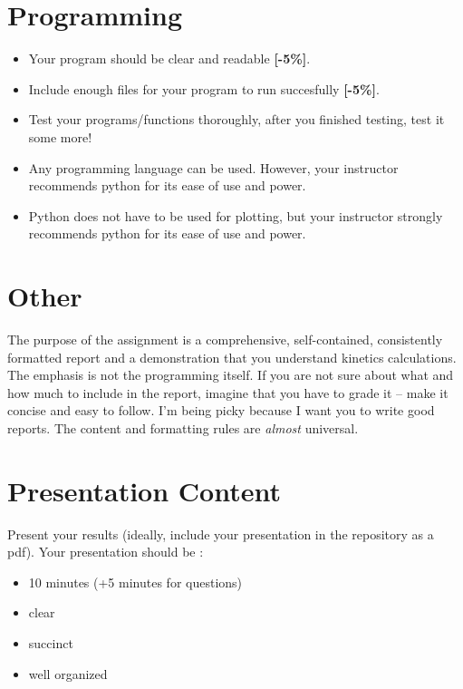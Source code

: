\documentclass{article}
\begin{document}
        \section{Programming}

        \begin{itemize}
                \item Your program should be clear and readable {\color{red}\textbf{[-5\%]}}. 
                \item Include enough files for your program to run succesfully {\color{red}\textbf{[-5\%]}}. 
                \item Test your programs/functions thoroughly, after you finished testing, test 
it some more!
\item    Any programming language can be used. However, your instructor 
        recommends python for its ease of use and power.
\item   Python does not have to be used for plotting, but your instructor 
        strongly recommends python for its ease of use and power.
        \end{itemize}

        \section{Other}
  The purpose of the assignment is a comprehensive, self-contained, 
  consistently formatted report and a demonstration that you understand 
  kinetics calculations. The emphasis is not the programming itself.  If you 
  are not sure about what and how much to include in the report, imagine that 
  you have to grade it – make it concise and easy to follow. I’m being picky 
  because I want you to write good reports.  The content and formatting rules 
  are \emph{almost} universal.

\section{Presentation Content}
Present your results (ideally, include your presentation in the repository as a 
pdf). Your presentation should be :
\begin{itemize}
        \item 10 minutes (+5 minutes for questions)
        \item clear
        \item succinct
        \item well organized
\end{itemize}
\end{document}
